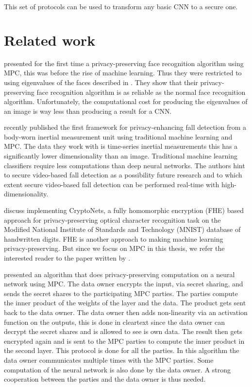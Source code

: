 This set of protocols can be used to transform any basic CNN to a secure one.

\section{Related work}
\cite{erkin2009privacy} presented for the first time a privacy-preserving face recognition algorithm using MPC, this was before the rise of machine learning. Thus they were restricted to using eigenvalues of the faces described in \cite{turk1991face}. They show that their privacy-preserving face recognition algorithm is as reliable as the normal face recognition algorithm. Unfortunately, the computational cost for producing the eigenvalues of an image is way less than producing a result for a CNN.

\cite{mainali2019privacy} recently published the first framework for privacy-enhancing fall detection from a body-worn inertial measurement unit using traditional machine learning and MPC. The data they work with is time-series inertial measurements this has a significantly lower dimensionality than an image. Traditional machine learning classifiers require less computations than deep neural networks. The authors hint to secure video-based fall detection as a possibility future research and to which extent secure video-based fall detection can be performed real-time with high-dimensionality.

\cite{gilad2016cryptonets} discuss implementing CryptoNets, a fully homomorphic encryption (FHE) based approach for privacy-preserving optical character recognition task on the Modified National Institute of Standards and Technology (MNIST) database of handwritten digits. FHE is another approach to making machine learning privacy-preserving. But since we focus on MPC in this thesis, we refer the interested reader to the paper written by \cite{gentry2009fully}.

\cite{barni2006privacy} presented an algorithm that does privacy-preserving computation on a neural network using MPC. The data owner encrypts the input, via secret sharing, and sends the secret shares to the participating MPC parties. The parties compute the inner product of the weights of the layer and the data. The product gets sent back to the data owner. The data owner then adds non-linearity via an activation function on the outputs, this is done in cleartext since the data owner can decrypt the secret shares and is allowed to see is own data. The result then gets encrypted again and is sent to the MPC parties to compute the inner product in the second layer. This protocol is done for all the parties. In this algorithm the data owner communicates multiple times with the MPC parties. Some computation of the neural network is also done by the data owner. A strong cooperation between the parties and the data owner is thus needed.

